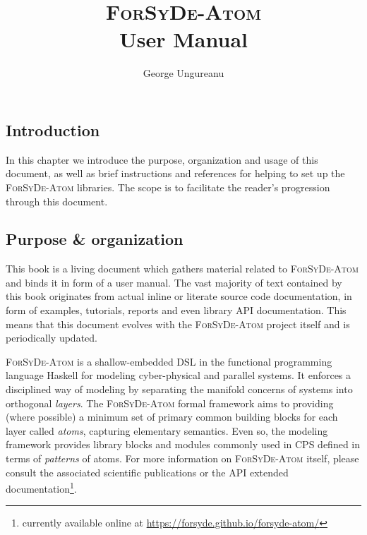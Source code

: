 \documentclass{book}
\title{\textsc{ForSyDe-Atom}\\User Manual}
\author{George Ungureanu}
\begin{document}
\dominitoc



\tableofcontents
\clearpage
\listoffigures
\mainmatter
{}

\begin{refsection}
\chapter{Introduction}
\label{cha:introduction}

\begin{summary}
  In this chapter we introduce the purpose, organization and usage of this document, as well as brief instructions and references for helping to set up the \textsc{ForSyDe-Atom} libraries. The scope is to facilitate the reader's progression through this document.
\end{summary}

\section{Purpose \& organization}
\label{sec:purp-organ}

This book is a living document which gathers material related to \textsc{ForSyDe-Atom} and binds it in form of a user manual. The vast majority of text contained by this book originates from actual inline or literate source code documentation, in form of examples, tutorials, reports and even library API documentation. This means that this document evolves with the \textsc{ForSyDe-Atom} project itself and is periodically updated.

\textsc{ForSyDe-Atom} is a shallow-embedded DSL in the functional programming language Haskell for modeling cyber-physical and parallel systems. It enforces a disciplined way of modeling by separating the manifold concerns of systems into orthogonal \emph{layers}. The \textsc{ForSyDe-Atom} formal framework aims to providing (where possible) a minimum set of primary common building blocks for each layer called \emph{atoms}, capturing elementary semantics. Even so, the modeling framework provides library blocks and modules commonly used in CPS defined in terms of \emph{patterns} of atoms. For more information on \textsc{ForSyDe-Atom} itself, please consult the associated scientific publications or the API extended documentation\footnote{currently available online at \url{https://forsyde.github.io/forsyde-atom/}}.


\end{refsection}
\end{document}
